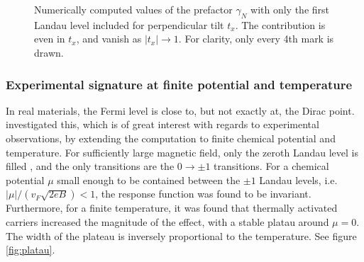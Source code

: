 \begin{figure}[htb]
  \centering
  \caption{Numerically computed values of the prefactor \( \gamma_N \) with only the first Landau level included for perpendicular tilt \( t_x \).
    The contribution is even in \( t_x \), and vanish as \( |t_x| \to 1 \).
    For clarity, only every 4th mark is drawn.
    \label{fig:0tontx}
  }
\end{figure}


\subsubsection{Experimental signature at finite potential and temperature}
In real materials, the Fermi level is close to, but not exactly at, the Dirac point.
\textcite{arjonaFingerprintsConformalAnomaly2019} investigated this, which is of great interest with regards to experimental observations, by extending the computation to finite chemical potential and temperature.
For sufficiently large magnetic field, only the zeroth Landau level is filled \cite{arjonaFingerprintsConformalAnomaly2019,vozmedianoTheoreticalPhysicsColloquium2021}, and the only transitions are the \( 0 \to \pm 1 \) transitions.
For a chemical potential \( \mu \) small enough to be contained between the \( \pm 1 \) Landau levels, i.e. \( |\mu| /(v_F \sqrt{2eB} ) < 1 \), the response function was found to be invariant.
Furthermore, for a finite temperature, it was found that thermally activated carriers increased the magnitude of the effect, with a stable platau around \( \mu = 0 \).
The width of the plateau is inversely proportional to the temperature.
See figure \ref{fig:platau}.

